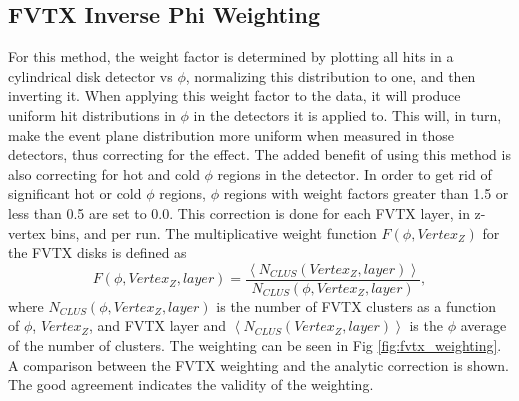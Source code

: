 \subsection{FVTX Inverse Phi Weighting}
\label{sec:FVTX_inv_phi_weight}
For this method, the weight factor is determined by plotting all hits in a cylindrical disk detector vs $\phi$, normalizing this distribution to one, and then inverting it. When applying this weight factor to the data, it will produce uniform hit distributions in $\phi$ in the detectors it is applied to. This will, in turn, make the event plane distribution more uniform when measured in those detectors, thus correcting for the effect. The added benefit of using this method is also correcting for hot and cold $\phi$ regions in the detector. In order to get rid of significant hot or cold $\phi$ regions, $\phi$ regions with weight factors greater than 1.5 or less than 0.5 are set to 0.0. This correction is done for each FVTX layer, in z-vertex bins, and per run. The multiplicative weight function $F(\phi,Vertex_Z)$ for the FVTX disks is defined as 
\begin{equation}
F(\phi,Vertex_Z,layer) = \frac{\left<N_{CLUS}(Vertex_Z,layer)\right>}{N_{CLUS}(\phi,Vertex_Z,layer)},
\end{equation}
where $N_{CLUS}(\phi,Vertex_Z,layer)$ is the number of FVTX clusters as a function of $\phi$, $Vertex_Z$, and FVTX layer and $\left<N_{CLUS}(Vertex_Z,layer)\right>$ is the $\phi$ average of the number of clusters. The weighting can be seen in Fig \ref{fig:fvtx_weighting}. A comparison between the FVTX weighting and the analytic correction is shown. The good agreement indicates the validity of the weighting.

